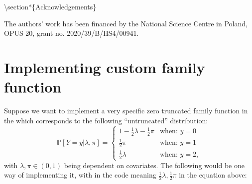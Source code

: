 \documentclass[
]{jss}
\newcommand{\1}{\mathcal{I}} \newcommand{\bZero}{\boldsymbol{0}}
\begin{document}
\textbackslash section*\{Acknowledgements\}

The authors' work has been financed by the National Science Centre in
Poland, OPUS 20, grant no. 2020/39/B/HS4/00941.

\appendix

\section[Implementing custom singleRcapture family function]{Implementing
custom  family
function}\label{implementing-custom-family-function}

Suppose we want to implement a very specific zero truncated family
function in the  which corresponds to the following
``untruncated'' distribution: \begin{equation}
  \mathbb{P}[Y=y|\lambda, \pi] = \begin{cases}
    1 - \frac{1}{2}\lambda - \frac{1}{2}\pi & \text{when: } y=0\\
    \frac{1}{2}\pi & \text{when: } y=1\\
    \frac{1}{2}\lambda & \text{when: } y=2,
  \end{cases}
\end{equation} with \(\lambda, \pi\in\left(0, 1\right)\) being dependent
on covariates. The following would be one way of implementing it, with
 in the code meaning
\(\frac{1}{2}\lambda,\frac{1}{2}\pi\) in the equation above:

\footnotesize
\end{document}

